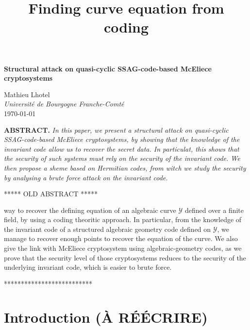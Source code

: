 \documentclass[10pt]{article}
\title{Finding curve equation from coding}
\newcommand{\s}{\vspace{0.3cm}}
\newcommand{\Y}{\mathcal{Y}}
\begin{document}
\s
\begin{titlepage}

  \begin{center}
  		
        \vspace*{5cm}
 		\textbf{\bf{\Large{Structural attack on quasi-cyclic SSAG-code-based McEliece cryptosystems}}}

 		\vspace*{1cm}

  \large{Mathieu Lhotel} \\
  \large{\it{Université de Bourgogne Franche-Comté}}\\
  \large{\today}
    \end{center}

\vspace*{2cm}

\textbf{ABSTRACT.} \text{} 
\it In this paper, we present a structural attack on quasi-cyclic SSAG-code-based McEliece cryptosystems, by showing that the knowledge of the invariant code allow us to recover the secret data. In particulat, this shows that the security of such systems must rely on the security of the invariant code. We then propose a sheme based on Hermitian codes, from witch we study the security by analysing a brute force attack on the invariant code.   

\s

***** OLD ABSTRACT *****

\s

way to recover the defining equation of an algebraic curve $\Y$ defined over a finite field, by using a coding theoritic approach. In particular, from the knowledge of the invariant code of a structured algebraic geometry code defined on $\Y$, we manage to recover enough points to recover the equation of the curve. We also give the link with McEliece cryptosystem using algebraic-geometry codes, as we prove that the security level of those cryptosystems reduces to the security of the underlying invariant code, which is easier to brute force.

\s

**************************


\end{titlepage}



\section{Introduction  (À RÉÉCRIRE)}
\end{document}
